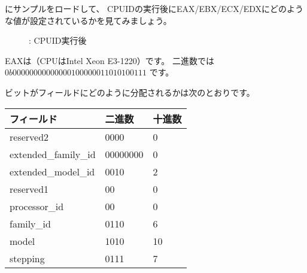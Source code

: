 ﻿\clearpage
{}
\myindex{\olly}

\olly にサンプルをロードして、
CPUIDの実行後にEAX/EBX/ECX/EDXにどのような値が設定されているかを見てみましょう。

\begin{figure}[H]
\centering
{}
\caption{\olly: CPUID実行後}
\label{fig:cpuid_olly_1}
\end{figure}

EAXは（\ac{CPU}はIntel Xeon E3-1220）です。
二進数では $0b0000 0000 0000 0010 0000 0110 1010 0111$ です。

ビットがフィールドにどのように分配されるかは次のとおりです。

\begin{center}
\begin{tabular}{ | l | l | l | }
\hline
\headercolor{} フィールド &
\headercolor{} 二進数 &
\headercolor{} 十進数 \\
\hline
reserved2		& 0000 & 0 \\
\hline
extended\_family\_id	& 00000000 & 0 \\
\hline
extended\_model\_id	& 0010 & 2 \\
\hline
reserved1		& 00 & 0 \\
\hline
processor\_id		& 00 & 0 \\
\hline
family\_id		& 0110 & 6 \\
\hline
model			& 1010 & 10 \\
\hline
stepping		& 0111 & 7 \\
\hline
\end{tabular}
\end{center}


